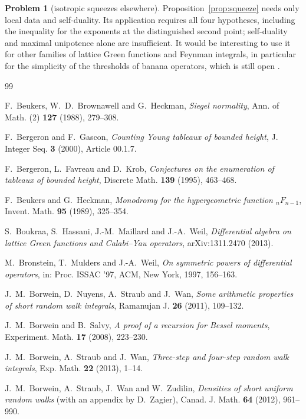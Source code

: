 \documentclass[11pt]{amsart}
\theoremstyle{definition}
\newtheorem{problem}[thm]{Problem}
\begin{document}
\begin{problem}[isotropic squeezes elsewhere]
Proposition~\ref{prop:squeeze} needs only local data and self-duality. Its application requires all four hypotheses, including the inequality for the exponents at the distinguished second point; self-duality and maximal unipotence alone are insufficient. It would be interesting to use it for other families of lattice Green functions and Feynman integrals, in particular for the simplicity of the thresholds of banana operators, which is still open \cite[Rem.~8.1]{KBan2}.
\end{problem}
\begin{thebibliography}{99}

F.~Beukers, W.~D.~Brownawell and G.~Heckman,
\emph{Siegel normality},
Ann. of Math. (2) \textbf{127} (1988), 279--308.

F.~Bergeron and F.~Gascon,
\emph{Counting Young tableaux of bounded height},
J. Integer Seq. \textbf{3} (2000), Article 00.1.7.

F.~Bergeron, L.~Favreau and D.~Krob,
\emph{Conjectures on the enumeration of tableaux of bounded height},
Discrete Math. \textbf{139} (1995), 463--468.

F.~Beukers and G.~Heckman,
\emph{Monodromy for the hypergeometric function ${}_nF_{n-1}$},
Invent. Math. \textbf{95} (1989), 325--354.

S.~Boukraa, S.~Hassani, J.-M.~Maillard and J.-A.~Weil,
\emph{Differential algebra on lattice Green functions and Calabi--Yau operators},
arXiv:1311.2470 (2013).

M.~Bronstein, T.~Mulders and J.-A.~Weil,
\emph{On symmetric powers of differential operators},
in: Proc. ISSAC '97, ACM, New York, 1997, 156--163.

J.~M.~Borwein, D.~Nuyens, A.~Straub and J.~Wan,
\emph{Some arithmetic properties of short random walk integrals},
Ramanujan J. \textbf{26} (2011), 109--132.

J.~M.~Borwein and B.~Salvy,
\emph{A proof of a recursion for Bessel moments},
Experiment. Math. \textbf{17} (2008), 223--230.

J.~M.~Borwein, A.~Straub and J.~Wan,
\emph{Three-step and four-step random walk integrals},
Exp. Math. \textbf{22} (2013), 1--14.

J.~M.~Borwein, A.~Straub, J.~Wan and W.~Zudilin,
\emph{Densities of short uniform random walks} (with an appendix by D.~Zagier),
Canad. J. Math. \textbf{64} (2012), 961--990.


\end{thebibliography}
\end{document}

